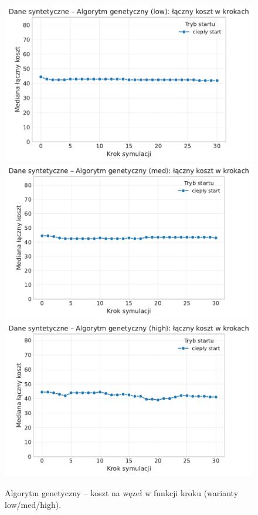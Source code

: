 \begin{figure}[H]
  \centering
  \includegraphics[width=0.62\linewidth]{assets/figures/dynamic/synthetic/synthetic_algorytm_genetyczny_cost_over_steps_low.pdf}\\[0.4em]
  \includegraphics[width=0.62\linewidth]{assets/figures/dynamic/synthetic/synthetic_algorytm_genetyczny_cost_over_steps_med.pdf}\\[0.4em]
  \includegraphics[width=0.62\linewidth]{assets/figures/dynamic/synthetic/synthetic_algorytm_genetyczny_cost_over_steps_high.pdf}
  \caption{Algorytm genetyczny -- koszt na węzeł w funkcji kroku (warianty low/med/high).}
  \label{fig:dyn-synth-genetic-cost}
\end{figure}

